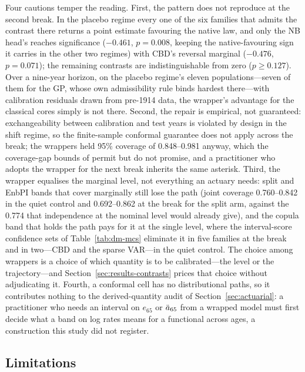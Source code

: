 Four cautions temper the reading. First, the pattern does not reproduce
at the second break. In the placebo regime every one of the six families
that admits the contrast there returns a point estimate favouring the
native law, and only the NB head's reaches significance ($-0.461$,
$p=0.008$, keeping the native-favouring sign it carries in the other two
regimes) with CBD's reversal marginal ($-0.476$, $p=0.071$); the remaining
contrasts are indistinguishable from zero ($p\ge0.127$). Over a nine-year
horizon, on the placebo regime's eleven populations---seven of them for
the GP, whose own admissibility rule binds hardest there---with
calibration residuals drawn from pre-1914 data, the wrapper's advantage
for the classical cores simply is not there. Second, the repair is
empirical, not guaranteed:
exchangeability between calibration and test years is violated by design
in the shift regime, so the finite-sample conformal guarantee does not
apply across the break; the wrappers held 95\% coverage of 0.848--0.981
anyway, which the coverage-gap bounds of \citet{barber2023conformal}
permit but do not promise, and a practitioner who adopts the wrapper for
the next break inherits the same asterisk. Third, the wrapper equalises
the marginal level, not everything an actuary needs: split and EnbPI
bands that cover marginally still lose the path (joint coverage
0.760--0.842 in the quiet control and 0.692--0.862 at the break for the
split arm, against the 0.774 that independence at the nominal level
would already give), and the copula band that holds the path pays for it at the
single level, where the interval-score confidence sets of
Table~\ref{tab:dm-mcs} eliminate it in five families at the break and in
two---CBD and the sparse VAR---in the quiet control. The choice among
wrappers is a choice of which quantity is to be
calibrated---the level or the trajectory---and
Section~\ref{sec:results-contrasts} prices that choice without
adjudicating it. Fourth, a conformal cell has no distributional paths, so
it contributes nothing to the derived-quantity audit of
Section~\ref{sec:actuarial}: a practitioner who needs an interval on
$e_{65}$ or $\ddot{a}_{65}$ from a wrapped model must first decide what a band
on log rates means for a functional across ages, a construction this
study did not register.

\subsection{Limitations}
\label{sec:discussion-limitations}
\label{sec:discussion-limits}

